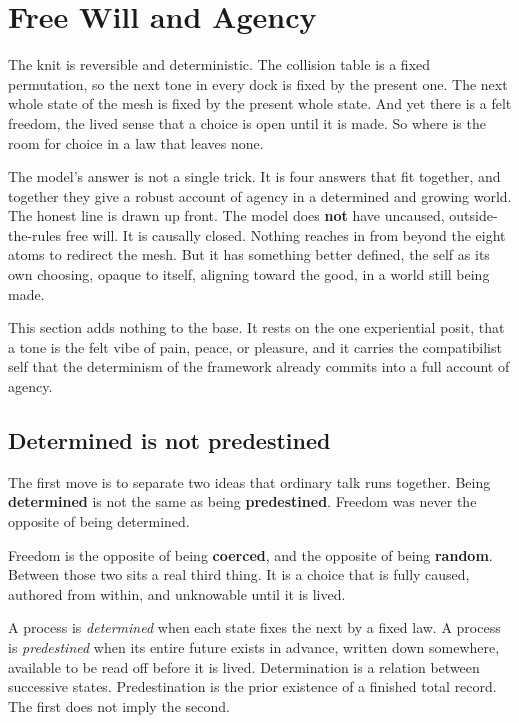 \section{Free Will and Agency}

The knit is reversible and deterministic. The collision table is a fixed permutation, so the next tone in every dock is fixed by the present one. The next whole state of the mesh is fixed by the present whole state. And yet there is a felt freedom, the lived sense that a choice is open until it is made. So where is the room for choice in a law that leaves none.

The model's answer is not a single trick. It is four answers that fit together, and together they give a robust account of agency in a determined and growing world. The honest line is drawn up front. The model does \textbf{not} have uncaused, outside-the-rules free will. It is causally closed. Nothing reaches in from beyond the eight atoms to redirect the mesh. But it has something better defined, the self as its own choosing, opaque to itself, aligning toward the good, in a world still being made.

This section adds nothing to the base. It rests on the one experiential posit, that a tone is the felt vibe of pain, peace, or pleasure, and it carries the compatibilist self that the determinism of the framework already commits into a full account of agency.

\subsection{Determined is not predestined}

The first move is to separate two ideas that ordinary talk runs together. Being \textbf{determined} is not the same as being \textbf{predestined}. Freedom was never the opposite of being determined.

Freedom is the opposite of being \textbf{coerced}, and the opposite of being \textbf{random}. Between those two sits a real third thing. It is a choice that is fully caused, authored from within, and unknowable until it is lived.

\begin{definition}
A process is \emph{determined} when each state fixes the next by a fixed law. A process is \emph{predestined} when its entire future exists in advance, written down somewhere, available to be read off before it is lived. Determination is a relation between successive states. Predestination is the prior existence of a finished total record. The first does not imply the second.
\end{definition}

